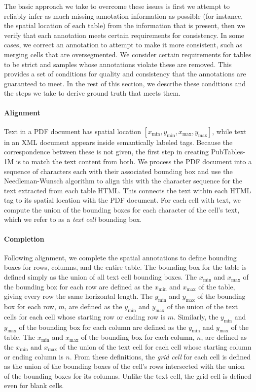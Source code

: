 \documentclass[10pt,twocolumn,letterpaper]{article}
\begin{document}
The basic approach we take to overcome these issues is first we attempt to reliably infer as much missing annotation information as possible (for instance, the spatial location of each table) from the information that is present, then we verify that each annotation meets certain requirements for consistency.
In some cases, we correct an annotation to attempt to make it more consistent, such as merging cells that are oversegmented.
We consider certain requirements for tables to be strict and samples whose annotations violate these are removed.
This provides a set of conditions for quality and consistency that the annotations are guaranteed to meet.
In the rest of this section, we describe these conditions and the steps we take to derive ground truth that meets them.

\paragraph{Alignment}
Text in a PDF document has spatial location $[x_\text{min}, y_\text{min}, x_\text{max}, y_\text{max}]$, while text in an XML document appears inside semantically labeled tags.
Because the correspondence between these is not given, the first step in creating PubTables-1M is to match the text content from both.
We process the PDF document into a sequence of characters each with their associated bounding box and use the Needleman-Wunsch algorithm \cite{needleman1970general} to align this with the character sequence for the text extracted from each table HTML.
This connects the text within each HTML tag to its spatial location with the PDF document.
For each cell with text, we compute the union of the bounding boxes for each character of the cell's text, which we refer to as a \emph{text cell} bounding box.

\paragraph{Completion}
Following alignment, we complete the spatial annotations to define bounding boxes for rows, columns, and the entire table.
The bounding box for the table is defined simply as the union of all text cell bounding boxes.
The $x_\text{min}$ and $x_\text{max}$ of the bounding box for each row are defined as the $x_\text{min}$ and $x_\text{max}$ of the table, giving every row the same horizontal length.
The $y_\text{min}$ and $y_\text{max}$ of the bounding box for each row, $m$, are defined as the $y_\text{min}$ and $y_\text{max}$ of the union of the text cells for each cell whose starting row or ending row is $m$.
Similarly, the $y_\text{min}$ and $y_\text{max}$ of the bounding box for each column are defined as the $y_\text{min}$ and $y_\text{max}$ of the table.
The $x_\text{min}$ and $x_\text{max}$ of the bounding box for each column, $n$, are defined as the $x_\text{min}$ and $x_\text{max}$ of the union of the text cell for each cell whose starting column or ending column is $n$.
From these definitions, the \emph{grid cell} for each cell is defined as the union of the bounding boxes of the cell's rows intersected with the union of the bounding boxes for its columns.
Unlike the text cell, the grid cell is defined even for blank cells.
\end{document}
